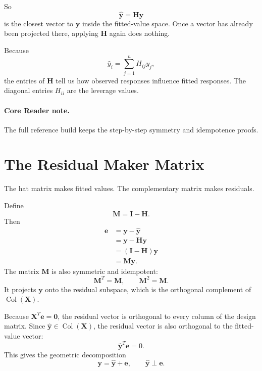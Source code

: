 {So
\begin{equation}
  \widehat{\mathbf{y}}=\mathbf{H}\mathbf{y}
\end{equation}
is the closest vector to \(\mathbf{y}\) inside the fitted-value space.  Once a vector has already been projected there, applying \(\mathbf{H}\) again does nothing.

Because
\begin{equation}
  \widehat{y}_i=\sum_{j=1}^n H_{ij}y_j,
\end{equation}
the entries of \(\mathbf{H}\) tell us how observed responses influence fitted responses.  The diagonal entries \(H_{ii}\) are the leverage values.

\paragraph{Core Reader note.}
The full reference build keeps the step-by-step symmetry and idempotence proofs.
}

\section{The Residual Maker Matrix}

The hat matrix makes fitted values.  The complementary matrix makes residuals.

Define
\begin{equation}
  \mathbf{M}=\mathbf{I}-\mathbf{H}.
\end{equation}
Then
\begin{align}
  \mathbf{e}
  &=\mathbf{y}-\widehat{\mathbf{y}} \\
  &=\mathbf{y}-\mathbf{H}\mathbf{y} \\
  &=(\mathbf{I}-\mathbf{H})\mathbf{y} \\
  &=\mathbf{M}\mathbf{y}.
\end{align}
The matrix \(\mathbf{M}\) is also symmetric and idempotent:
\begin{equation}
  \mathbf{M}^T=\mathbf{M},
  \qquad
  \mathbf{M}^2=\mathbf{M}.
\end{equation}
It projects \(\mathbf{y}\) onto the residual subspace, which is the orthogonal complement of \(\operatorname{Col}(\mathbf{X})\).

Because \(\mathbf{X}^T\mathbf{e}=\mathbf{0}\), the residual vector is orthogonal to every column of the design matrix.  Since \(\widehat{\mathbf{y}}\in\operatorname{Col}(\mathbf{X})\), the residual vector is also orthogonal to the fitted-value vector:
\begin{equation}
  \widehat{\mathbf{y}}^T\mathbf{e}=0.
\end{equation}
This gives the geometric decomposition
\begin{equation}
  \mathbf{y}=\widehat{\mathbf{y}}+\mathbf{e},
  \qquad
  \widehat{\mathbf{y}}\perp \mathbf{e}.
\end{equation}

